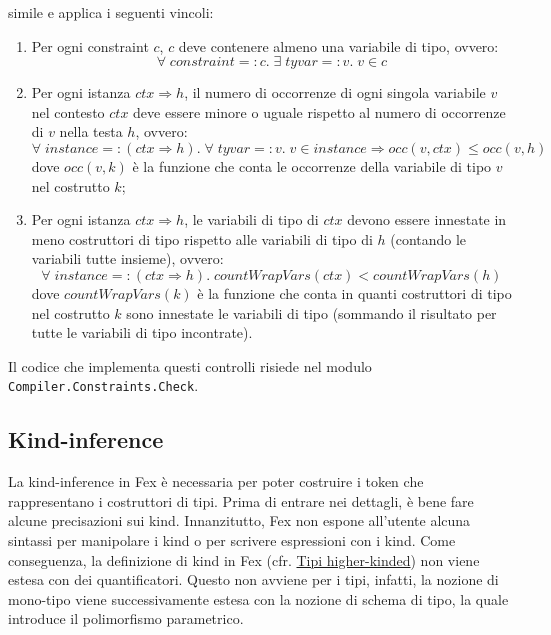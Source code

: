 \documentclass[10pt,a4paper]{article}
\begin{document}
simile e applica i seguenti vincoli:
\begin{enumerate}
    \item Per ogni constraint $ c $, $ c $ deve contenere almeno una variabile di tipo, ovvero:
    \[ \forall \; constraint =: c.\; \exists \; tyvar =: v.\; v \in c \]
    \item Per ogni istanza $ ctx \Rightarrow h $, il numero di occorrenze di ogni singola variabile $ v $ nel contesto
    $ ctx $ deve essere minore o uguale rispetto al numero di occorrenze di $ v $ nella testa $ h $, ovvero:
    \[ \forall \; instance =: (ctx \Rightarrow h).\; \forall \; tyvar =: v.\; v \in instance
    \Longrightarrow occ(v, ctx) \leq occ(v, h) \]
    dove $ occ(v, k) $ è la funzione che conta le occorrenze della variabile di tipo $ v $ nel costrutto $ k $;
    \item Per ogni istanza $ ctx \Rightarrow h $, le variabili di tipo di $ ctx $ devono essere innestate in meno
    costruttori di tipo rispetto alle variabili di tipo di $ h $ (contando le variabili tutte insieme), ovvero: \newline
    \[ \forall \; instance =: (ctx \Rightarrow h).\; countWrapVars(ctx) < countWrapVars(h) \]
    dove $ countWrapVars(k) $ è la funzione che conta in quanti costruttori di tipo nel costrutto $ k $ sono innestate le
    variabili di tipo (sommando il risultato per tutte le variabili di tipo incontrate).
\end{enumerate}
Il codice che implementa questi controlli risiede nel modulo \texttt{Compiler.Constraints.Check}.

\hypertarget{Kind-inference}{\subsection{Kind-inference}}
La kind-inference in Fex è necessaria per poter costruire i token che rappresentano i costruttori di tipi. Prima
di entrare nei dettagli, è bene fare alcune precisazioni sui kind. Innanzitutto, Fex non espone all'utente alcuna
sintassi per manipolare i kind o per scrivere espressioni con i kind. Come conseguenza, la definizione di kind in
Fex (cfr. \hyperlink{Tipi higher-kinded}{Tipi higher-kinded}) non viene estesa con dei quantificatori.
Questo non avviene per i tipi,
infatti, la nozione di mono-tipo viene successivamente estesa con la nozione di schema di tipo, la quale introduce
il polimorfismo parametrico.
\end{document}
